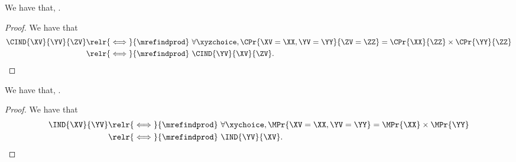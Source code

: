 \begin{proposition}
  We have that, \indsymmdefa.%
\end{proposition}

\begin{proof}
  We have that
  \begin{align*}
    \CIND{\XV}{\YV}{\ZV} 
    \relr {\iff} {\mrefindprod} &\ 
    \forall \xyzchoice,
    \CPr{\XV = \XX, \YV = \YY}{\ZV = \ZZ} = 
    \CPr{\XX}{\ZZ}
    \times
    \CPr{\YY}{\ZZ}\\
    \relr {\iff} {\mrefindprod} &\ 
    \CIND{\YV}{\XV}{\ZV}.
  \end{align*}%
\end{proof}

\begin{proposition}
  We have that, \indsymmdefb.%
\end{proposition}

\begin{proof}
  We have that
  \begin{align*}
    \IND{\XV}{\YV} 
    \relr {\iff} {\mrefindprod} &\ 
    \forall \xychoice,
    \MPr{\XV = \XX, \YV = \YY} = 
    \MPr{\XX}
    \times
    \MPr{\YY}\\
    \relr {\iff} {\mrefindprod} &\ 
    \IND{\YV}{\XV}.
  \end{align*}%
\end{proof}
